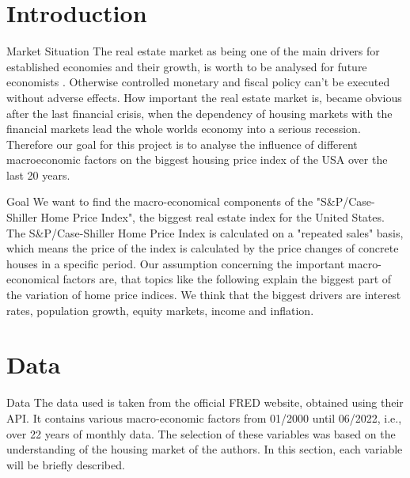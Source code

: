 \section{Introduction} %
\begin{frame}{Market Situation}
The real estate market as being one of the main drivers for established economies and their growth, is worth to be analysed for future economists 
\parencite{Leblanc2009}. Otherwise controlled monetary and fiscal policy can't be executed without adverse effects. How important the real estate market is, became obvious after the last financial crisis, when the dependency of housing markets with the financial markets lead the whole worlds economy into a serious recession. Therefore our goal for this project is to analyse the influence of different macroeconomic factors on the biggest housing price index of the USA over the last 20 years.
\end{frame}

\begin{frame}{Goal}
We want to find the macro-economical components of the "S\&P/Case-Shiller Home Price Index", the biggest real estate index for the United States. The S\&P/Case-Shiller Home Price Index is calculated on a "repeated sales" basis, which means the price of the index is calculated by the price changes of concrete houses in a specific period.
Our assumption concerning the important macro-economical factors are, that topics like the following explain the biggest part of the variation of home price indices. We think that the biggest drivers are interest rates, population growth, equity markets, income and inflation.
\end{frame}

\section{Data} %
\begin{frame}{Data}
    The data used is taken from the official FRED website, obtained using their API. It contains various macro-economic factors from 01/2000 until 06/2022, i.e., over 22 years of monthly data. The selection of these variables was based on the understanding of the housing market of the authors. In this section, each variable will be  briefly described.
\end{frame}


